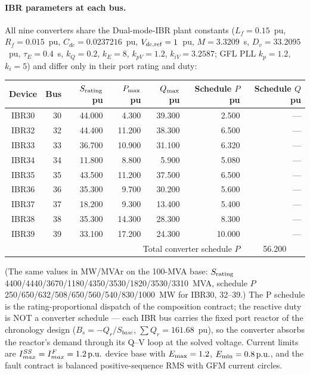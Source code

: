 \documentclass[12pt,a4paper]{article}
\newcommand{\pu}{\ifmmode\,\mathrm{p.u.}\else\ p.u.\fi}
\begin{document}
\paragraph{IBR parameters at each bus.}  All nine converters share the
Dual-mode-IBR plant constants ($L_f=0.15$~pu, $R_f=0.015$~pu,
$C_{dc}=0.0237216$~pu, $V_{dc,\rm ref}=1$~pu, $M=3.3209$~s,
$D_v=33.2095$~pu, $\tau_E=0.4$~s, $k_Q=0.2$, $k_E=8$, $k_{pV}=1.2$,
$k_{iV}=3.2587$; GFL PLL $k_p=1.2$, $k_i=5$) and differ only in their port
rating and duty:
\begin{center}\footnotesize
\begin{tabular}{crrrrrr}
\toprule
Device & Bus & $S_{\rm rating}$ pu & $P_{\rm max}$ pu & $Q_{\rm max}$ pu & Schedule $P$ pu & Schedule $Q$ pu\\
\midrule
IBR30 & 30 & 44.000 & 4.300  & 39.300 & 2.500  & ---\\
IBR32 & 32 & 44.400 & 11.200 & 38.300 & 6.500  & ---\\
IBR33 & 33 & 36.700 & 10.900 & 31.100 & 6.320  & ---\\
IBR34 & 34 & 11.800 & 8.800  & 5.900  & 5.080  & ---\\
IBR35 & 35 & 43.500 & 11.200 & 37.500 & 6.500  & ---\\
IBR36 & 36 & 35.300 & 9.700  & 30.200 & 5.600  & ---\\
IBR37 & 37 & 18.200 & 9.300  & 13.400 & 5.400  & ---\\
IBR38 & 38 & 35.300 & 14.300 & 28.300 & 8.300  & ---\\
IBR39 & 39 & 33.100 & 17.200 & 24.300 & 10.000 & ---\\
\midrule
\multicolumn{6}{r}{Total converter schedule $P$} & \multicolumn{1}{c}{56.200}\\
\bottomrule
\end{tabular}
\end{center}
(The same values in MW/MVAr on the 100-MVA base: $S_{\rm rating}$
4400/4440/3670/1180/4350/3530/1820/3530/3310~MVA, schedule $P$
250/650/632/508/650/560/540/830/1000~MW for IBR30, 32--39.)
The P schedule is the rating-proportional dispatch of the composition
contract; the reactive duty is NOT a converter schedule --- each IBR bus
carries the fixed port reactor of the chronology design
($B_s=-Q_r/S_{base}$, $\sum Q_r = 161.68$~pu), so the converter absorbs
the reactor's demand through its Q--V loop at the solved voltage.  Current
limits are $I_{max}^{SS}=I_{max}^{F}=1.2\pu$ device base with
$E_{\rm max}=1.2$, $E_{\rm min}=0.8\pu$, and the fault contract is balanced
positive-sequence RMS with GFM current circles.
\end{document}
